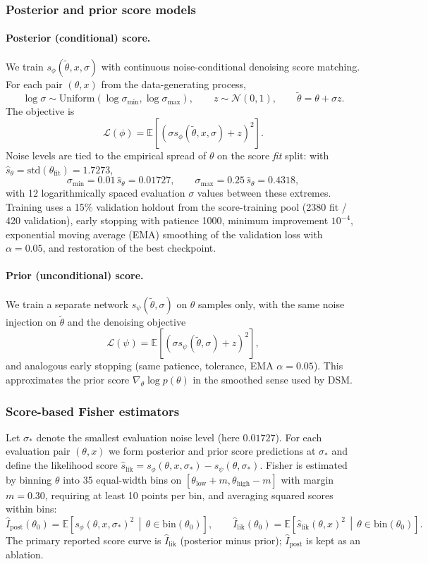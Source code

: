 \subsubsection*{Posterior and prior score models}
\paragraph{Posterior (conditional) score.}
We train $s_\phi(\tilde\theta,x,\sigma)$ with continuous noise-conditional denoising score matching. For each pair $(\theta,x)$ from the data-generating process,
\[
\log\sigma\sim\mathrm{Uniform}(\log\sigma_{\min},\log\sigma_{\max}),\qquad z\sim\mathcal N(0,1),\qquad \tilde\theta=\theta+\sigma z.
\]
The objective is
\[
\mathcal L(\phi)=\mathbb E\left[\left(\sigma s_\phi(\tilde\theta,x,\sigma)+z\right)^2\right].
\]
Noise levels are tied to the empirical spread of $\theta$ on the score \emph{fit} split: with $\hat s_\theta=\mathrm{std}(\theta_{\text{fit}})=1.7273$,
\[
\sigma_{\min}=0.01\,\hat s_\theta=0.01727,\qquad
\sigma_{\max}=0.25\,\hat s_\theta=0.4318,
\]
with 12 logarithmically spaced evaluation $\sigma$ values between these extremes. Training uses a 15\% validation holdout from the score-training pool (2380 fit / 420 validation), early stopping with patience 1000, minimum improvement $10^{-4}$, exponential moving average (EMA) smoothing of the validation loss with $\alpha=0.05$, and restoration of the best checkpoint.

\paragraph{Prior (unconditional) score.}
We train a separate network $s_\psi(\tilde\theta,\sigma)$ on $\theta$ samples only, with the same noise injection on $\tilde\theta$ and the denoising objective
\[
\mathcal L(\psi)=\mathbb E\left[\left(\sigma s_\psi(\tilde\theta,\sigma)+z\right)^2\right],
\]
and analogous early stopping (same patience, tolerance, EMA $\alpha=0.05$). This approximates the prior score $\nabla_\theta\log p(\theta)$ in the smoothed sense used by DSM.

\subsubsection*{Score-based Fisher estimators}
Let $\sigma_\ast$ denote the smallest evaluation noise level (here $0.01727$). For each evaluation pair $(\theta,x)$ we form posterior and prior score predictions at $\sigma_\ast$ and define the likelihood score $\hat s_{\mathrm{lik}}=s_\phi(\theta,x,\sigma_\ast)-s_\psi(\theta,\sigma_\ast)$. Fisher is estimated by binning $\theta$ into 35 equal-width bins on $[\theta_{\mathrm{low}}+m,\theta_{\mathrm{high}}-m]$ with margin $m=0.30$, requiring at least 10 points per bin, and averaging squared scores within bins:
\[
\widehat I_{\mathrm{post}}(\theta_0)=\mathbb E\!\left[s_\phi(\theta,x,\sigma_\ast)^2\,\middle|\,\theta\in\mathrm{bin}(\theta_0)\right],\qquad
\widehat I_{\mathrm{lik}}(\theta_0)=\mathbb E\!\left[\hat s_{\mathrm{lik}}(\theta,x)^2\,\middle|\,\theta\in\mathrm{bin}(\theta_0)\right].
\]
The primary reported score curve is $\widehat I_{\mathrm{lik}}$ (posterior minus prior); $\widehat I_{\mathrm{post}}$ is kept as an ablation.

